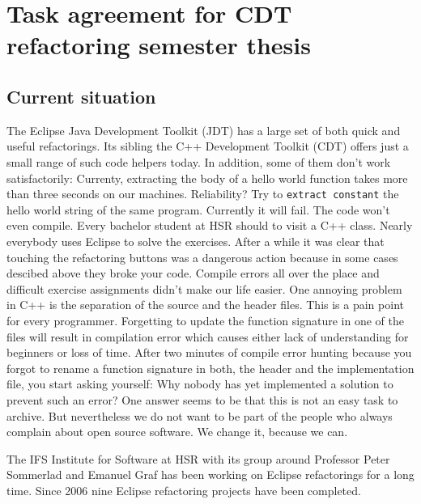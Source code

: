 \documentclass[a4paper,10pt]{scrreprt}
\begin{document}
\section*{Task agreement for CDT refactoring semester thesis}

\subsection*{Current situation}

The Eclipse Java Development Toolkit (JDT) has a large set of both quick and
useful refactorings. Its sibling the C++ Development Toolkit (CDT) offers just a
small range of such code helpers today. In addition, some of them don't work
satisfactorily: Currenty, extracting the body of a hello world function takes more than
three seconds on our machines. Reliability? Try to \texttt{extract constant} the
hello world string of the same program. Currently it will fail. The code won't even
compile.\newline
Every bachelor student at HSR should to visit a C++ class. Nearly
everybody uses Eclipse to solve the exercises. After a while it was clear that
touching the refactoring buttons was a dangerous action because in some cases
descibed above they broke your code. Compile errors all over the place and
difficult exercise assignments didn't make our life easier.\newline
One annoying problem in C++ is the separation of the source and the header
files. This is a pain point for every programmer. Forgetting to update the
function signature in one of the files will result in compilation error which
causes either lack of understanding for beginners or loss of time.\newline
After two minutes of compile error hunting because you forgot to rename a
function signature in both, the header and the implementation file, you start
asking yourself: Why nobody has yet implemented a solution to prevent such an
error?\newline
One answer seems to be that this is not an easy task to archive. But
nevertheless we do not want to be part of the people who always complain about
open source software. We change it, because we can. \newline
 
The IFS Institute for Software at HSR with its group around Professor Peter Sommerlad and
Emanuel Graf has been working on Eclipse refactorings for a long time. Since
2006 nine Eclipse refactoring projects have been completed.\newline
\end{document}
